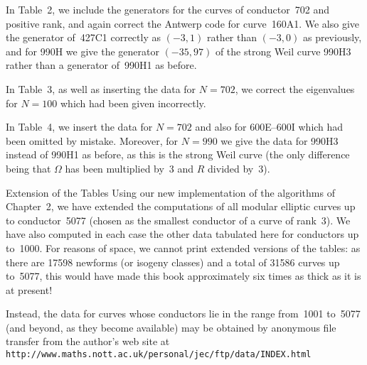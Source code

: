 In Table~2, we include the generators for the curves of conductor~702
and positive rank, and again correct the Antwerp code for curve~160A1.
We also give the generator of~427C1 correctly as $(-3,1)$ rather than
$(-3,0)$ as previously, and for 990H we give the generator $(-35,97)$
of the strong Weil curve 990H3 rather than a generator of~990H1 as
before.

In Table~3, as well as inserting the data for $N=702$, we correct the
eigenvalues for $N=100$ which had been given incorrectly.

In Table~4, we insert the data for $N=702$ and also for 600E--600I
which had been omitted by mistake.  Moreover, for $N=990$ we give the
data for 990H3 instead of 990H1 as before, as this is the strong Weil
curve (the only difference being that $\Omega$ has been multiplied
by~3 and $R$ divided by~3).

\subhead Extension of the Tables \endsubhead  %
%
Using our new implementation of the algorithms of Chapter~2, we have
extended the computations of all modular elliptic curves up to
conductor~5077 (chosen as the smallest conductor of a curve of
rank~3).  We have also computed in each case the other data tabulated
here for conductors up to~1000.  For reasons of space, we cannot print
extended versions of the tables: as there are 17598 newforms (or
isogeny classes) and a total of 31586 curves up to~5077, this would
have made this book approximately six times as thick as it is at
present!

Instead, the data for curves whose conductors lie in the range
from~1001 to~5077 (and beyond, as they become available) may be
obtained by anonymous file transfer from
the author's web site at
\hbox{\tt
http://www.maths.nott.ac.uk/personal/jec/ftp/data/INDEX.html}


